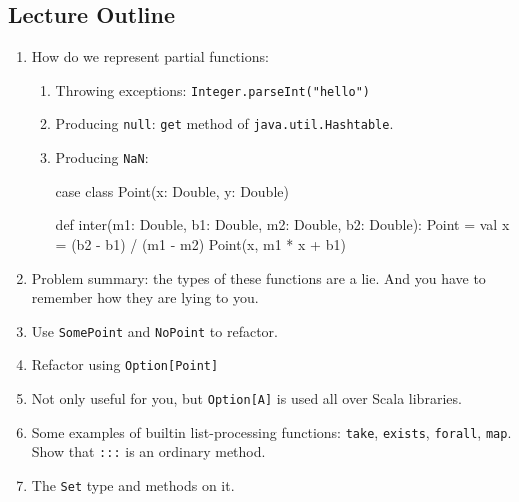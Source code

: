 \newlecture

\begin{instructor}

\section*{Lecture Outline}

\begin{enumerate}

\item How do we represent partial functions:

  \begin{enumerate}

    \item Throwing exceptions: \lstinline|Integer.parseInt("hello")|

    \item Producing \lstinline|null|: \lstinline|get| method of
      \lstinline|java.util.Hashtable|.

    \item Producing \lstinline|NaN|:
\begin{scalacode}
 case class Point(x: Double, y: Double)

 def inter(m1: Double, b1: Double, m2: Double, b2: Double): Point = {
   val x = (b2 - b1) / (m1 - m2)
   Point(x, m1 * x + b1)
 }
\end{scalacode}

      
  \end{enumerate}

  \item Problem summary: the types of these functions are a lie. And
    you have to remember how they are lying to you.

  \item Use \lstinline|SomePoint| and \lstinline|NoPoint| to refactor.

  \item Refactor using \lstinline|Option[Point]|

  \item Not only useful for you, but \lstinline|Option[A]| is used all over
    Scala libraries.

  \item Some examples of builtin list-processing functions:
    \lstinline|take|, \lstinline|exists|, \lstinline|forall|,
    \lstinline|map|. Show that \lstinline|:::| is an ordinary method.

  \item The \lstinline|Set| type and methods on it.


\end{enumerate}
\end{instructor}

